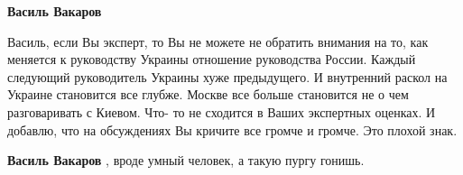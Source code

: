 \begin{itemize}
\begin{itemize}
\textbf{Василь Вакаров} 

Василь, если Вы эксперт, то Вы не можете не обратить внимания на то, как
меняется к руководству Украины отношение руководства России. Каждый следующий
руководитель Украины хуже предыдущего. И внутренний раскол на Украине
становится все глубже. Москве все больше становится не о чем разговаривать с
Киевом. Что- то не сходится в Ваших экспертных оценках. И добавлю, что на
обсуждениях Вы кричите все громче и громче. Это плохой знак.


\textbf{Василь Вакаров} , вроде умный человек, а такую пургу гонишь.

\end{itemize} %


\end{itemize} %
